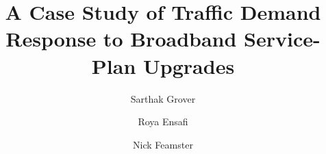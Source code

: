 \documentclass{llncs}
\begin{document}
\begin{sloppypar}

\mainmatter 

\title{A Case Study of Traffic Demand Response to Broadband Service-Plan Upgrades}

\author{Sarthak Grover \and Roya Ensafi \and Nick Feamster}


\maketitle












\balance\label{lastpage}


\end{sloppypar}



\small
\setlength{\parskip}{-1pt}
\setlength{\itemsep}{-1pt}
\balance

\end{document}
